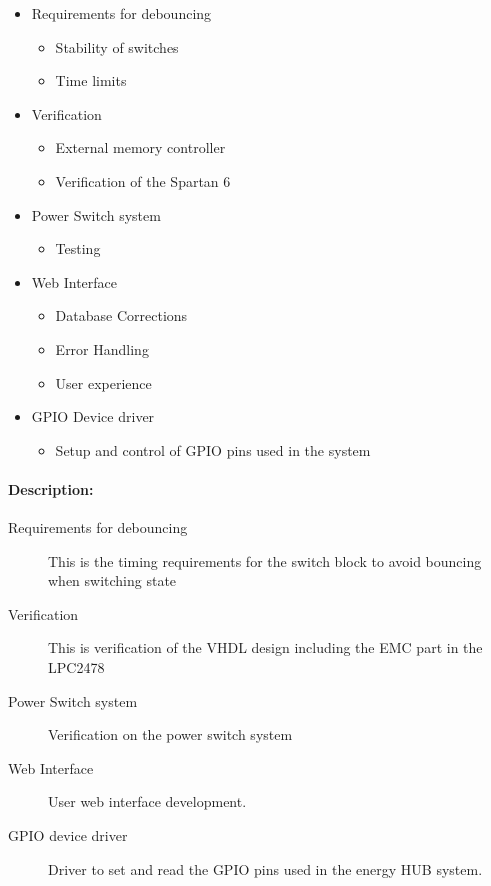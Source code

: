 \begin{itemize}
	\item Requirements for debouncing
	\begin{itemize}
		\item Stability of switches
		\item Time limits
	\end{itemize}
	\item Verification
	\begin{itemize}
		\item External memory controller
		\item Verification of the Spartan 6
	\end{itemize}
	\item Power Switch system
		\begin{itemize}
			\item Testing
		\end{itemize}
	\item Web Interface
		\begin{itemize}
			\item Database Corrections
			\item Error Handling
			\item User experience
		\end{itemize}
	\item GPIO Device driver
	\begin{itemize}
		\item Setup and control of GPIO pins used in the system
	\end{itemize}
\end{itemize}

\paragraph{Description:}

\begin{description}
	\item[Requirements for debouncing] This is the timing requirements for the switch block to avoid bouncing when switching state
	\item[Verification] This is verification of the VHDL design including the EMC part in the LPC2478
	\item[Power Switch system] Verification on the power switch system
	\item[Web Interface] User web interface development.
	\item[GPIO device driver] Driver to set and read the GPIO pins used in the energy HUB system. 
\end{description}

